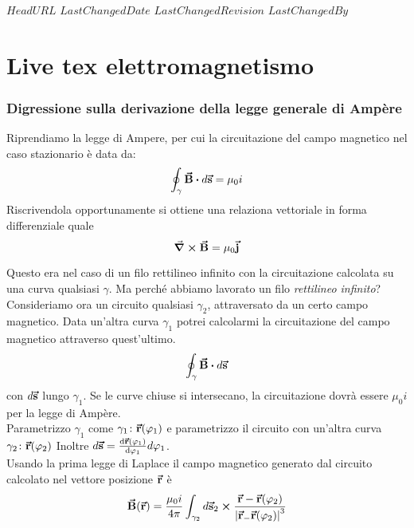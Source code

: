 \svnidlong
{$HeadURL$}
{$LastChangedDate$}
{$LastChangedRevision$}
{$LastChangedBy$}

\chapter{Live tex elettromagnetismo}
\subsection{Digressione sulla derivazione della legge generale di Ampère}
Riprendiamo la legge di Ampere, per cui la circuitazione del campo magnetico nel caso stazionario è data da:
\begin{equation*}
	\oint_\gamma \vba B\vdot d\vba s = \mu_0 i	
\end{equation*}
Riscrivendola opportunamente
si ottiene una relaziona vettoriale in forma differenziale quale
\begin{equation*}
	\grad\cross\vb*{\va{B}}= \mu_0 \vb*{\va{j}}
\end{equation*}

Questo era nel caso di un filo rettilineo infinito con la circuitazione calcolata su una curva qualsiasi $\gamma$. Ma perché abbiamo lavorato un filo \textit{rettilineo infinito}?\\
Consideriamo ora un circuito qualsiasi $\gamma_2$, attraversato da un certo campo magnetico.
Data un'altra curva $\gamma_1$ potrei calcolarmi la circuitazione del campo magnetico attraverso quest'ultimo.
\begin{equation*}
	\oint_\gamma \vba B\vdot d\vba s
\end{equation*}
con $d\vb*{\va{s}}$ lungo $\gamma_1$. Se le curve chiuse si intersecano, la circuitazione dovrà essere $\mu_0 i$ per la legge di Ampère.\\
Parametrizzo $\gamma_1$ come $\gamma_1 \colon \vb*{\va{r}}(\varphi_1)$ e parametrizzo il circuito con un'altra curva $\gamma_2 \colon \vb*{\va{r}}(\varphi_2)$ Inoltre $d\vb*{\va{s}}= \dv{\vb*{\va{r}} (\varphi_1)}{\varphi_1} d\varphi_1$.\\
Usando la prima legge di Laplace il campo magnetico generato dal circuito calcolato nel vettore posizione $\vb*{\va{r}}$ è
\begin{equation*}
	\vb*{\va{B}} (\vb*{\va{r}})=\frac{\mu_0 i}{4\pi}\int_{\gamma_2} d\vb*{\va{s}}_2 \cross \frac{\vb*{\va{r}} - \vb*{\va{r}} (\varphi_2)}{\abs{\vb*{\va{r}}_ - \vb*{\va{r}} (\varphi_2)}^3}
\end{equation*}

